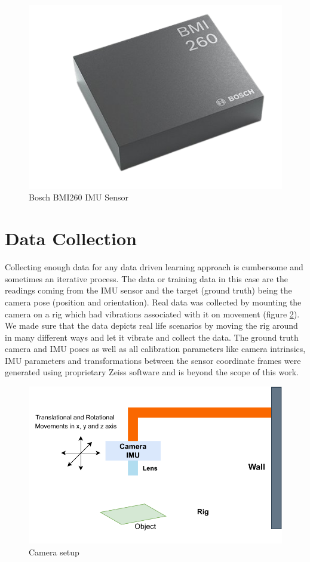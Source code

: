 \begin{figure}[H]
    \centering
    \includegraphics[scale=0.2]{images/fig_chapter4/bmi260.png}
    \caption{Bosch BMI260 IMU Sensor}
    \label{fig:imu_bmi260}
\end{figure}

\section{Data Collection}
Collecting enough data for any data driven learning approach is cumbersome and sometimes an iterative process. The data or training data in this case are the readings coming from the IMU sensor and the target (ground truth) being the camera pose (position and orientation). Real data was collected by mounting the camera on a rig which had vibrations associated with it on movement (figure \ref{fig:camera_rig}). We made sure that the data depicts real life scenarios by moving the rig around in many different ways and let it vibrate and collect the data. The ground truth camera and IMU poses as well as all calibration parameters like camera intrinsics, IMU parameters and transformations between the sensor coordinate frames were generated using proprietary Zeiss software and is beyond the scope of this work.

\begin{figure}[H]
    \centering
    \includegraphics[scale=0.8]{images/fig_chapter4/camera_rig.pdf}
    \caption{Camera setup}
    \label{fig:camera_rig}
\end{figure}

